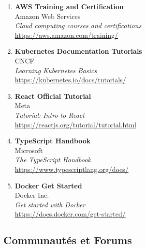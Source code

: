 \begin{enumerate}
    \item \textbf{AWS Training and Certification} \\
    Amazon Web Services \\
    \textit{Cloud computing courses and certifications} \\
    \url{https://aws.amazon.com/training/}

    \item \textbf{Kubernetes Documentation Tutorials} \\
    CNCF \\
    \textit{Learning Kubernetes Basics} \\
    \url{https://kubernetes.io/docs/tutorials/}

    \item \textbf{React Official Tutorial} \\
    Meta \\
    \textit{Tutorial: Intro to React} \\
    \url{https://reactjs.org/tutorial/tutorial.html}

    \item \textbf{TypeScript Handbook} \\
    Microsoft \\
    \textit{The TypeScript Handbook} \\
    \url{https://www.typescriptlang.org/docs/}

    \item \textbf{Docker Get Started} \\
    Docker Inc. \\
    \textit{Get started with Docker} \\
    \url{https://docs.docker.com/get-started/}
\end{enumerate}

\subsection{Communautés et Forums}


